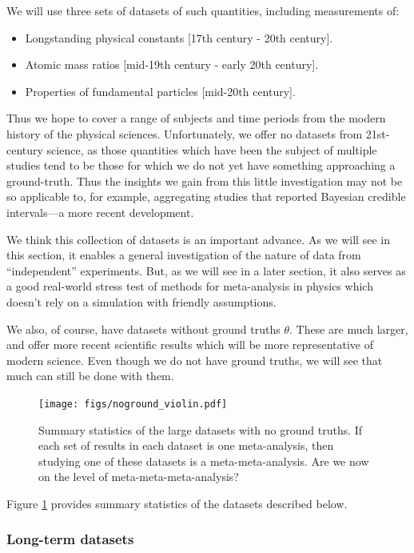 \documentclass[letterpaper,12pt]{article}
\begin{document}
We will use three sets of datasets of such quantities, including measurements of:
\begin{itemize}
  \item Longstanding physical constants [17th century - 20th century].
  \item Atomic mass ratios [mid-19th century - early 20th century].
  \item Properties of fundamental particles [mid-20th century].
\end{itemize}
Thus we hope to cover a range of subjects and time periods from the modern history of the physical sciences. Unfortunately, we offer no datasets from 21st-century science, as those quantities which have been the subject of multiple studies tend to be those for which we do not yet have something approaching a ground-truth. Thus the insights we gain from this little investigation may not be so applicable to, for example, aggregating studies that reported Bayesian credible intervals---a more recent development.

We think this collection of datasets is an important advance. As we will see in this section, it enables a general investigation of the nature of data from ``independent'' experiments. But, as we will see in a later section, it also serves as a good real-world stress test of methods for meta-analysis in physics which doesn't rely on a simulation with friendly assumptions.

We also, of course, have datasets without ground truths $\theta$. These are much larger, and offer more recent scientific results which will be more representative of modern science. Even though we do not have ground truths, we will see that much can still be done with them.

\begin{figure}[htbp]
  \centering
  \texttt{[image: figs/noground\_violin.pdf]}
  \caption{Summary statistics of the large datasets with no ground truths. If each set of results in each dataset is one meta-analysis, then studying one of these datasets is a meta-meta-analysis. Are we now on the level of meta-meta-meta-analysis?}\label{fig:noground-violin}
\end{figure}

Figure \ref{fig:noground-violin} provides summary statistics of the datasets described below.

\subsubsection{Long-term datasets}
\end{document}
